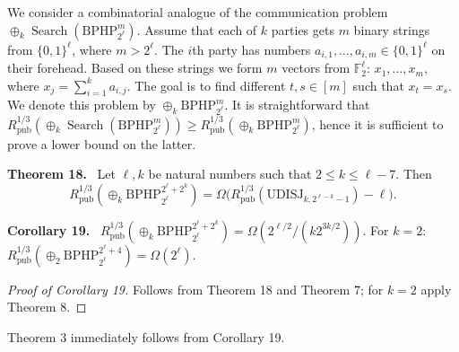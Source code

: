 \documentclass[10pt,a4paper]{article}
\newenvironment{authorclaim}[1]{\par\medskip\noindent\textbf{#1.}\ \ignorespaces}{\par\medskip}
\begin{document}
We consider a combinatorial analogue of the communication problem $\oplus_k\operatorname{Search}(\mathrm{BPHP}_{2^\ell}^m)$. Assume that each of $k$ parties gets $m$ binary strings from $\{0,1\}^\ell$, where $m>2^\ell$. The $i$th party has numbers $a_{i,1},\ldots,a_{i,m}\in\{0,1\}^\ell$ on their forehead. Based on these strings we form $m$ vectors from $\mathbb F_2^\ell$: $x_1,\ldots,x_m$, where $x_j=\sum_{i=1}^ka_{i,j}$. The goal is to find different $t,s\in[m]$ such that $x_t=x_s$. We denote this problem by $\oplus_k\mathrm{BPHP}_{2^\ell}^m$. It is straightforward that $R^{1/3}_{\mathrm{pub}}(\oplus_k\operatorname{Search}(\mathrm{BPHP}_{2^\ell}^m))\ge R^{1/3}_{\mathrm{pub}}(\oplus_k\mathrm{BPHP}_{2^\ell}^m)$, hence it is sufficient to prove a lower bound on the latter.
\begin{authorclaim}{Theorem 18}
Let $\ell,k$ be natural numbers such that $2\le k\le\ell-7$. Then
\[
R^{1/3}_{\mathrm{pub}}(\oplus_k\mathrm{BPHP}_{2^\ell}^{2^\ell+2^k})
=\Omega\big(R^{1/3}_{\mathrm{pub}}(\mathrm{UDISJ}_{k,2^{\ell-k}-1})-\ell\big).
\]
\end{authorclaim}
\begin{authorclaim}{Corollary 19}
$R^{1/3}_{\mathrm{pub}}(\oplus_k\mathrm{BPHP}_{2^\ell}^{2^\ell+2^k})=\Omega(2^{\ell/2}/(k2^{3k/2}))$. For $k=2$: $R^{1/3}_{\mathrm{pub}}(\oplus_2\mathrm{BPHP}_{2^\ell}^{2^\ell+4})=\Omega(2^\ell)$.
\end{authorclaim}
\begin{proof}[Proof of Corollary 19]
Follows from Theorem 18 and Theorem 7; for $k=2$ apply Theorem 8.
\end{proof}
Theorem 3 immediately follows from Corollary 19.
\end{document}
